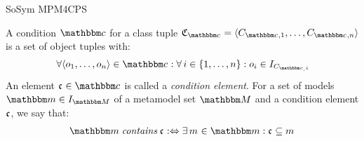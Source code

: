 \begin{copiedFrom}{SoSym MPM4CPS}
\begin{definition}[Condition]
    A condition $\condition{c}{}$ for a class tuple $\classtuple{C}{\condition{c}{}} = \tupled{\class{C}{\condition{c}{},1}, \dots, \class{C}{\condition{c}{},n}}$ is a set of object tuples %
    with: 
    \begin{align*}
    \formulaskip &
    \forall \tupled{\object{o}{1}, \dots, \object{o}{n}} \in \condition{c}{}: \forall i \in \setted{1, \dots, n} : \object{o}{i} \in \metamodelinstances{\class{C}{\condition{c}, i}}
    \end{align*}
    An element $\conditionelement{c}{} \in \condition{c}{}$ is called a \emph{condition element}.
    For a set of models $\modelset{m} \in \metamodelinstances{\metamodelset{M}}$ of a metamodel set $\metamodelset{M}$ and %
    a condition element $\mathfrak{c}_{}$, %
    we say that: 
    \begin{align*}
        \formulaskip &
        \modelset{m} \mathtext{contains} \conditionelement{c}{} \equivalentperdefinition
        \exists \model{m}{} \in \modelset{m} : \conditionelement{c}{} \subseteq \model{m}{}
    \end{align*}
\end{definition}


\end{copiedFrom}
